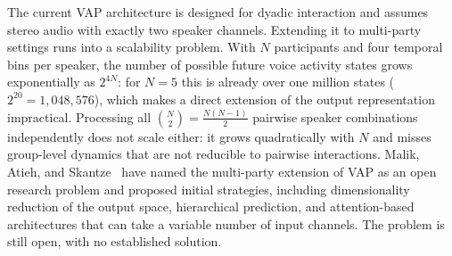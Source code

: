 The current VAP architecture is designed for dyadic interaction and assumes stereo audio with exactly two speaker channels. Extending it to multi-party settings runs into a scalability problem. With $N$ participants and four temporal bins per speaker, the number of possible future voice activity states grows exponentially as $2^{4N}$: for $N=5$ this is already over one million states ($2^{20} = 1{,}048{,}576$), which makes a direct extension of the output representation impractical. Processing all $\binom{N}{2} = \frac{N(N-1)}{2}$ pairwise speaker combinations independently does not scale either: it grows quadratically with $N$ and misses group-level dynamics that are not reducible to pairwise interactions. Malik, Atieh, and Skantze~\cite{malik2024vap} have named the multi-party extension of VAP as an open research problem and proposed initial strategies, including dimensionality reduction of the output space, hierarchical prediction, and attention-based architectures that can take a variable number of input channels. The problem is still open, with no established solution.

